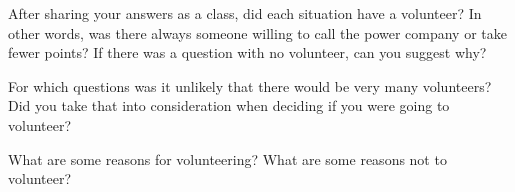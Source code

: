 \begin{xca}
After sharing your answers as a class, did each situation have a volunteer? In other words, was there always someone willing to call the power company or take fewer points? If there was a question with no volunteer, can you suggest why?
\end{xca} 

\begin{xca}
For which questions was it unlikely that there would be very many volunteers? Did you take that into consideration when deciding if you were going to volunteer?
\end{xca}

\begin{xca}
What are some reasons for volunteering? What are some reasons not to volunteer?
\end{xca}